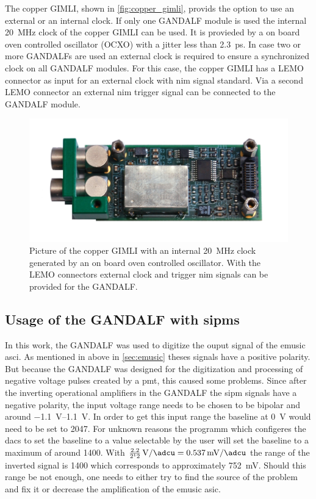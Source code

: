 The copper GIMLI, shown in \autoref{fig:copper_gimli}, provids the option to use an external or an internal clock.
If only one GANDALF module is used the internal \SI{20}{\mega\hertz} clock of the copper GIMLI can be used.
It is provieded by a on board oven controlled oscillator (OCXO) with a jitter less than \SI{2.3}{\pico\second}.
In case two or more GANDALFs are used an external clock is required to ensure a synchronized clock on all GANDALF modules.
For this case, the copper GIMLI has a LEMO connector as input for an external clock with \ac{nim} signal standard.
Via a second LEMO connector an external \ac{nim} trigger signal can be connected to the GANDALF module.

\begin{figure}
	\centering
	\includegraphics[width=.5\textwidth]{pictures/copper_gimli.png}
	\caption[Copper GIMLI]{Picture of the copper GIMLI with an internal \SI{20}{\mega\hertz} clock generated by an on board oven controlled oscillator. With the LEMO connectors external clock and trigger \ac{nim} signals can be provided for the GANDALF.}
	\label{fig:copper_gimli}
\end{figure}



\subsection{Usage of the GANDALF with \acp{sipm}}
In this work, the GANDALF was used to digitize the ouput signal of the \ac{emusic} \ac{asci}.
As mentioned in above in \autoref{sec:emusic} theses signals have a positive polarity.
But because the GANDALF was designed for the digitization and processing of negative voltage pulses created by a \ac{pmt}, this caused some problems.
Since after the inverting operational amplifiers in the GANDALF the \ac{sipm} signals have a negative polarity, the input voltage range needs to be chosen to be bipolar and around \SIrange{-1.1}{1.1}{\volt}.
In order to get this input range the baseline at \SI{0}{\volt} would need to be set to \SI{2047}{\adcu}.
For unknown reasons the programm which configeres the \acp{dac} to set the baseline to a \si{\adcu} value selectable by the user will set the baseline to a maximum of around \SI{1400}{\adcu}.
With $\frac{2.2}{2^12}\,\si{\volt\per\adcu} = \SI{0.537}{\milli\volt\per\adcu}$ the range of the inverted signal is \SI{1400}{\adcu} which corresponds to approximately \SI{752}{\milli\volt}.
Should this range be not enough, one needs to either try to find the source of the problem and fix it or decrease the amplification of the \ac{emusic} \ac{asic}.


